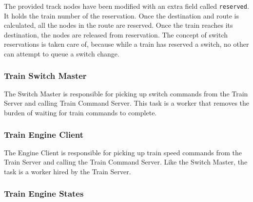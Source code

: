 \documentclass[letterpaper]{article}
\begin{document}
The provided track nodes have been modified with an extra field called \texttt{reserved}. It holds the train number of the reservation. Once the destination and route is calculated, all the nodes in the route are reserved. Once the train reaches its destination, the nodes are released from reservation.  The concept of switch reservations is taken care of, because while a train has reserved a switch, no other can attempt to queue a switch change.


\subsubsection{Train Switch Master%
  \label{train-switch-master}%
}

The Switch Master is responsible for picking up switch commands from the Train Server and calling Train Command Server. This task is a worker that removes the burden of waiting for train commands to complete.


\subsubsection{Train Engine Client%
  \label{train-engine-client}%
}

The Engine Client is responsible for picking up train speed commands from the Train Server and calling the Train Command Server. Like the Switch Master, the task is a worker hired by the Train Server.


\subsubsection{Train Engine States%
  \label{train-engine-states}%
}
\end{document}
